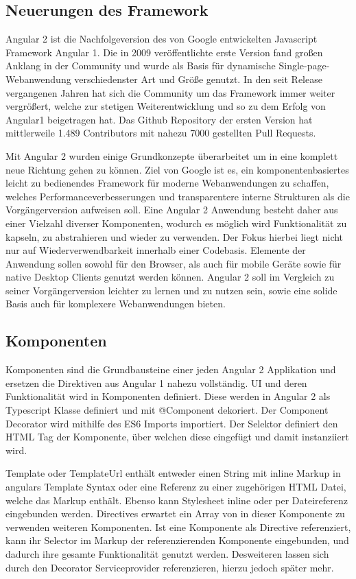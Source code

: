 \subsection{Neuerungen des Framework}

Angular 2 ist die Nachfolgeversion des von Google entwickelten Javascript Framework Angular 1.
Die in 2009 veröffentlichte erste Version fand großen Anklang in der Community
und wurde als Basis für dynamische Single-page-Webanwendung verschiedenster Art und Größe genutzt.
In den seit Release vergangenen Jahren hat sich die Community um das Framework immer weiter vergrößert,
welche zur stetigen Weiterentwicklung und so zu dem Erfolg von Angular1 beigetragen hat.
Das Github Repository der ersten Version hat mittlerweile 1.489 Contributors mit nahezu 7000 gestellten Pull Requests. \cite{ng1-github}

Mit Angular 2 wurden einige Grundkonzepte überarbeitet um in eine komplett neue Richtung gehen zu können.
Ziel von Google ist es, ein komponentenbasiertes leicht zu bedienendes Framework für moderne
Webanwendungen zu schaffen, welches Performanceverbesserungen und transparentere interne Strukturen als die Vorgängerversion aufweisen soll.
Eine Angular 2 Anwendung besteht daher aus einer Vielzahl diverser Komponenten, wodurch es möglich wird
Funktionalität zu kapseln, zu abstrahieren und wieder zu verwenden. Der Fokus hierbei liegt nicht nur auf Wiederverwendbarkeit innerhalb einer Codebasis.
Elemente der Anwendung sollen sowohl für den Browser, als auch für mobile Geräte sowie für native Desktop Clients genutzt werden können.
Angular 2 soll im Vergleich zu seiner Vorgängerversion leichter zu lernen und zu nutzen sein,
sowie eine solide Basis auch für komplexere Webanwendungen bieten. \cite[11-12]{Angular2}


\subsection{Komponenten}

Komponenten sind die Grundbausteine einer jeden Angular 2 Applikation und ersetzen die Direktiven aus Angular 1 nahezu vollständig.
UI und deren Funktionalität wird in Komponenten definiert.
Diese werden in Angular 2 als Typescript Klasse definiert und mit @Component dekoriert.
Der Component Decorator wird mithilfe des ES6 Imports importiert.
Der Selektor definiert den HTML Tag der Komponente, über welchen diese eingefügt und damit instanziiert wird.

Template oder TemplateUrl enthält entweder einen String mit inline Markup in angulars Template Syntax
oder eine Referenz zu einer zugehörigen HTML Datei, welche das Markup enthält.
Ebenso kann Stylesheet inline oder per Dateireferenz eingebunden werden.
Directives erwartet ein Array von in dieser Komponente zu verwenden weiteren Komponenten.
Ist eine Komponente als Directive referenziert,
kann ihr Selector im Markup der referenzierenden Komponente eingebunden,
und dadurch ihre gesamte Funktionalität genutzt werden.
Desweiteren lassen sich durch den Decorator Serviceprovider referenzieren, hierzu jedoch später mehr.

